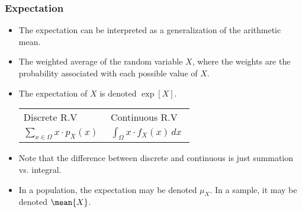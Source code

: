 \begin{frame}
\frametitle{Expectation} 
\begin{itemize}
\item The expectation can be interpreted as a generalization of the arithmetic mean.
\item The weighted average of the random variable $X$, where the weights are the probability associated with each possible value of $X$.
\item The expectation of $X$ is denoted $\exp[X]$.
\begin{center}
\begin{tabular}{C{0.3\linewidth}C{0.3\linewidth}}
\toprule
Discrete R.V 
    & Continuous R.V\\[2ex]
$\sum_{x\in\Omega} x \cdot p_X(x)$ 
    & $\int_{\Omega} x \cdot f_X(x)\,dx$\\
\bottomrule
\end{tabular}
\end{center}
\item Note that the difference between discrete and continuous is just summation vs. integral.
\item In a population, the expectation may be denoted $\mu_X$. In a sample, it may be denoted $\mean{X}$.
\end{itemize}
\end{frame}


